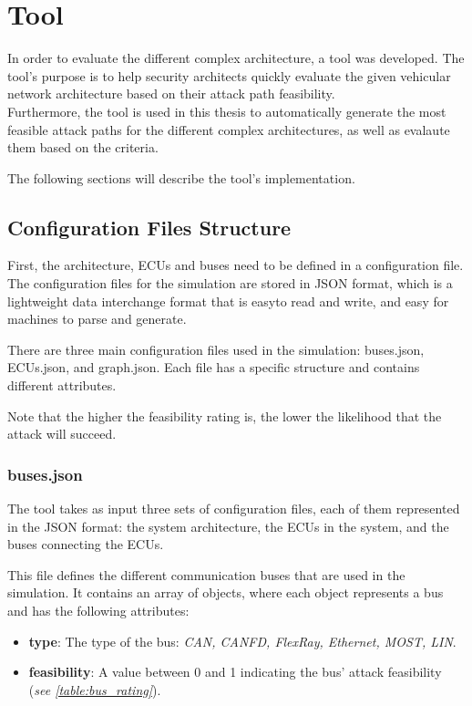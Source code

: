 \chapter{Tool}
\label{chp:tool}

In order to evaluate the different complex architecture, a tool was developed.
The tool's purpose is to help security architects quickly evaluate the given vehicular network architecture based on their \gls{attack path} feasibility.\\
Furthermore, the tool is used in this thesis to automatically generate the most feasible attack paths for the different complex architectures, 
as well as evalaute them based on the criteria.

The following sections will describe the tool's implementation.

\section{Configuration Files Structure}
\label{sec:config}

First, the architecture, ECUs and buses need to be defined in a configuration file.
The configuration files for the simulation are stored in JSON format, which is a lightweight data interchange format that is easyto read and write, and easy for machines to parse and generate.

There are three main configuration files used in the simulation: buses.json, ECUs.json, and graph.json.
Each file has a specific structure and contains different attributes.

Note that the higher the feasibility rating is, the lower the likelihood that the attack will succeed.

\subsection{buses.json}
\label{sec:buses}

The tool takes as input three sets of configuration files, each of them represented in the JSON format: 
the system architecture, the ECUs in the system, and the buses connecting the ECUs. 

This file defines the different communication buses that are used in the simulation. 
It contains an array of objects, where each object represents a bus and has the following attributes:

\begin{itemize}
\item \textbf{type}: The type of the bus: \textit{CAN, CANFD, FlexRay, Ethernet, MOST, LIN}.
\item \textbf{feasibility}: A value between 0 and 1 indicating the bus' attack feasibility (\textit{see \ref{table:bus_rating}}).
\end{itemize}

